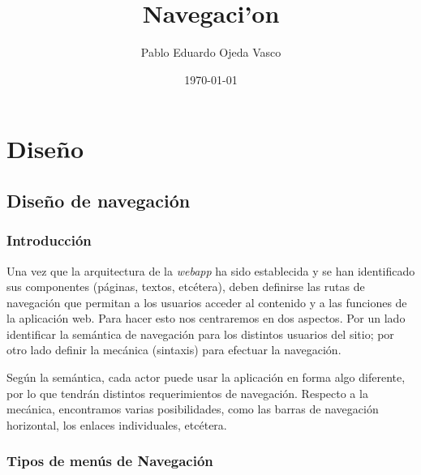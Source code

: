 \documentclass[a4paper,oneside,11pt]{book}
\begin{document}
\title{Navegaci'on}
\author{Pablo Eduardo Ojeda Vasco}
\date{\today}



	\maketitle
%
%
\chapter{Diseño} %
	\label{sec:diseno}

	\section{Diseño de navegación} %
	\label{sec:navegacion}
	
	\subsection{Introducción} %
		\label{sub:nav_introduccion}
	
		Una vez que la arquitectura de la \textit{webapp} ha sido establecida y se han identificado sus componentes (páginas, textos, etcétera), deben definirse las rutas de navegación que permitan a los usuarios acceder al contenido y a las funciones de la aplicación web. Para hacer esto nos centraremos en dos aspectos. Por un lado identificar la semántica de navegación para los distintos usuarios del sitio; por otro lado definir la mecánica (sintaxis) para efectuar la navegación.
		
		Según la semántica, cada actor puede usar la aplicación en forma algo diferente, por lo que tendrán distintos requerimientos de navegación. Respecto a la mecánica, encontramos varias posibilidades, como las barras de navegación horizontal, los enlaces individuales, etcétera.
		
	
	\subsection{Tipos de menús de Navegación} %
	\label{sub:nav_contenidos_y_navegacion}
		
\end{document}
